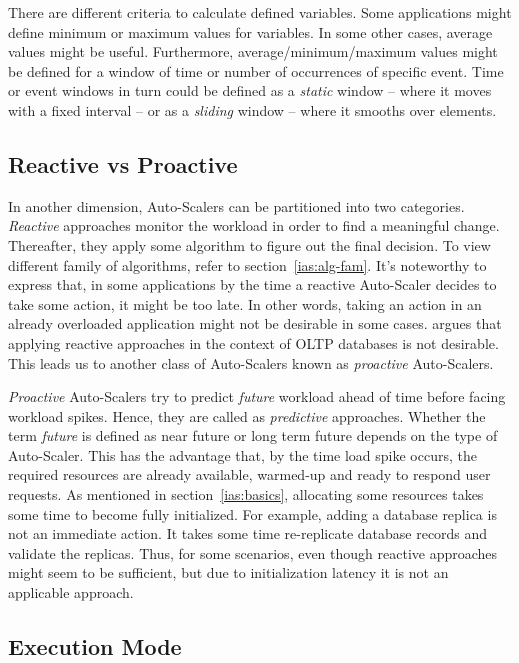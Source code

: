 There are different criteria to calculate defined variables. Some applications might define minimum or maximum values for variables. In some other cases, average values might be useful. Furthermore, average/minimum/maximum values might be defined for a window of time or number of occurrences of specific event. Time or event windows in turn could be defined as a \emph{static} window -- where it moves with a fixed interval -- or as a \emph{sliding} window -- where it smooths over elements.
\subsection{Reactive vs Proactive}
\label{ias:react-proact}

In another dimension, Auto-Scalers can be partitioned into two categories. \emph{Reactive} approaches monitor the workload in order to find a meaningful change. Thereafter, they apply some algorithm to figure out the final decision. To view different family of algorithms, refer to section~\ref{ias:alg-fam}. It's noteworthy to express that, in some applications by the time a reactive Auto-Scaler decides to take some action, it might be too late. In other words, taking an action in an already overloaded application might not be desirable in some cases. \textcite{Taft:2018} argues that applying reactive approaches in the context of OLTP databases is not desirable. This leads us to another class of Auto-Scalers known as \emph{proactive} Auto-Scalers.

\emph{Proactive} Auto-Scalers try to predict \emph{future} workload ahead of time before facing workload spikes. Hence, they are called as \emph{predictive} approaches. Whether the term \emph{future} is defined as near future or long term future depends on the type of Auto-Scaler. This has the advantage that, by the time load spike occurs, the required resources are already available, warmed-up and ready to respond user requests. As mentioned in section~\ref{ias:basics}, allocating some resources takes some time to become fully initialized. For example, adding a database replica is not an immediate action. It takes some time re-replicate database records and validate the replicas. Thus, for some scenarios, even though reactive approaches might seem to be sufficient, but due to initialization latency it is not an applicable approach.

\subsection{Execution Mode}
\label{ias:exec-mode}

